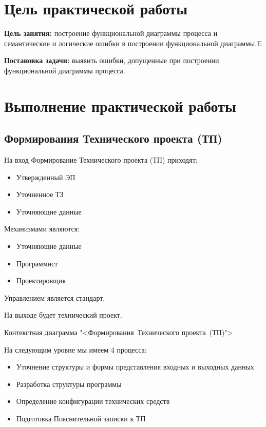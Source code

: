 \graphicspath{{./first/img/}}

\section{Цель практической работы}
\textbf{Цель занятия:} построение функциональной диаграммы процесса и
семантические и логические ошибки в построении функциональной диаграммы.E\par
\textbf{Постановка задачи:} выявить ошибки, допущенные при построении
функциональной диаграммы процесса.\par

\section{Выполнение практической работы}
\subsection{Формирования Технического проекта (ТП)}

На вход Формирование Технического проекта (ТП) приходят:
\begin{itemize}
	\item Утвержденный ЭП
	\item Уточненное ТЗ
	\item Уточняющие данные
\end{itemize}

Механизмами являются:
\begin{itemize}
	\item Уточняющие данные
	\item Программист
	\item Проектировщик
\end{itemize}

Управлением является стандарт.

На выходе будет технический проект.


\begin{image}
	\caption{Контекстная диаграмма "<Формирования~Технического проекта~(ТП)">}
	\label{fig:IDEF0:a0}
\end{image}

На следующим уровне мы имеем 4 процесса:
\begin{itemize}
	\item Уточнение структуры и формы представления входных и выходных данных
	\item Разработка структуры программы
	\item Определение конфигурации технических средств
	\item Подготовка Пояснительной записки к ТП
\end{itemize}


